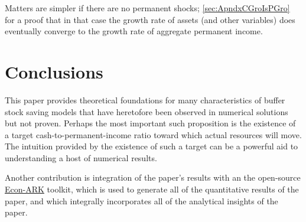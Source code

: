 \documentclass[./BufferStockTheory.tex]{subfiles}
\begin{document}
{Matters are simpler if there are no permanent shocks; \ref{sec:ApndxCGroIsPGro} for a proof that in that case the growth rate of assets (and other variables) does eventually converge to the growth rate of aggregate permanent income.


}%

\hypertarget{Conclusions}{}
\section{Conclusions}

This paper provides theoretical foundations for many characteristics
of buffer stock saving models that have heretofore been observed in
numerical solutions but not proven.  Perhaps the most important such
proposition is the existence of a target cash-to-permanent-income
ratio toward which actual resources will move.  The intuition provided by
the existence of such a target can be a powerful aid to understanding a host
of numerical results.

Another contribution is integration of the paper's results with an the open-source \href{https://econ-ark.org}{Econ-ARK} toolkit, which is used to generate all of the quantitative results of the paper, and which integrally incorporates all of the analytical insights of the paper.

\clearpage\vfill\eject

\onlyinsubfile{}
\end{document}

